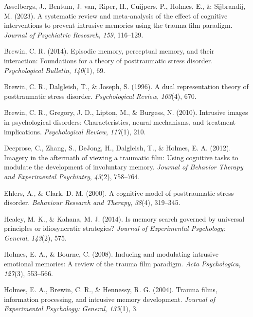 \documentclass[
  man,
  floatsintext,
  longtable,
  nolmodern,
  notxfonts,
  notimes,
  draftfirst,
  colorlinks=true,linkcolor=blue,citecolor=blue,urlcolor=blue]{apa7}
\newlength{\cslhangindent}
\newenvironment{CSLReferences}[2] %
 {\begin{list}{}{%
  \setlength{\itemindent}{0pt}
  \setlength{\leftmargin}{0pt}
  \setlength{\parsep}{0pt}
  \ifodd #1
   \setlength{\leftmargin}{\cslhangindent}
   \setlength{\itemindent}{-1\cslhangindent}
  \fi
  \setlength{\itemsep}{#2\baselineskip}}}
 {\end{list}}
\begin{document}
\label{refs}
\begin{CSLReferences}{1}{0}
Asselbergs, J., Bentum, J. van, Riper, H., Cuijpers, P., Holmes, E., \&
Sijbrandij, M. (2023). A systematic review and meta-analysis of the
effect of cognitive interventions to prevent intrusive memories using
the trauma film paradigm. \emph{Journal of Psychiatric Research},
\emph{159}, 116--129.

Brewin, C. R. (2014). Episodic memory, perceptual memory, and their
interaction: Foundations for a theory of posttraumatic stress disorder.
\emph{Psychological Bulletin}, \emph{140}(1), 69.

Brewin, C. R., Dalgleish, T., \& Joseph, S. (1996). A dual
representation theory of posttraumatic stress disorder.
\emph{Psychological Review}, \emph{103}(4), 670.

Brewin, C. R., Gregory, J. D., Lipton, M., \& Burgess, N. (2010).
Intrusive images in psychological disorders: Characteristics, neural
mechanisms, and treatment implications. \emph{Psychological Review},
\emph{117}(1), 210.

Deeprose, C., Zhang, S., DeJong, H., Dalgleish, T., \& Holmes, E. A.
(2012). Imagery in the aftermath of viewing a traumatic film: Using
cognitive tasks to modulate the development of involuntary memory.
\emph{Journal of Behavior Therapy and Experimental Psychiatry},
\emph{43}(2), 758--764.

Ehlers, A., \& Clark, D. M. (2000). A cognitive model of posttraumatic
stress disorder. \emph{Behaviour Research and Therapy}, \emph{38}(4),
319--345.

Healey, M. K., \& Kahana, M. J. (2014). Is memory search governed by
universal principles or idiosyncratic strategies? \emph{Journal of
Experimental Psychology: General}, \emph{143}(2), 575.

Holmes, E. A., \& Bourne, C. (2008). Inducing and modulating intrusive
emotional memories: A review of the trauma film paradigm. \emph{Acta
Psychologica}, \emph{127}(3), 553--566.

Holmes, E. A., Brewin, C. R., \& Hennessy, R. G. (2004). Trauma films,
information processing, and intrusive memory development. \emph{Journal
of Experimental Psychology: General}, \emph{133}(1), 3.


\end{CSLReferences}
\end{document}
